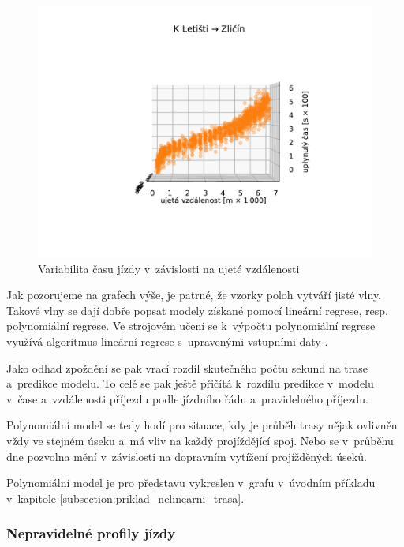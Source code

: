 \begin{figure}
\centering
  \includegraphics[width=\linewidth]{../img/dojezd_podle_vzdalenosti}
  \caption{Variabilita času jízdy v~závislosti na ujeté vzdálenosti}
  \label{fig:dojezd_podle_vzdalenosti}
\end{figure}


Jak pozorujeme na grafech výše, je patrné, že vzorky poloh vytváří jisté vlny. Takové vlny se dají dobře popsat modely získané pomocí lineární regrese, resp. polynomiální regrese. Ve strojovém učení se k~výpočtu polynomiální regrese využívá algoritmus lineární regrese s~upravenými vstupními daty \citep[viz][Strany 265--268]{Gareth13}.


\bigbreak

Jako odhad zpoždění se pak vrací rozdíl skutečného počtu sekund na trase a~predikce modelu. To celé se pak ještě přičítá k~rozdílu predikce v~modelu v~čase a~vzdálenosti příjezdu podle jízdního řádu a~pravidelného příjezdu.


\bigbreak

Polynomiální model se tedy hodí pro situace, kdy je průběh trasy nějak ovlivněn vždy ve stejném úseku a~má vliv na každý projíždějící spoj. Nebo se v~průběhu dne pozvolna mění v~závislosti na dopravním vytížení projížděných úseků.

\bigbreak


Polynomiální model je pro představu vykreslen v~grafu v~úvodním příkladu v~kapitole \ref{subsection:priklad_nelinearni_trasa}.


\subsubsection{Nepravidelné profily jízdy}


